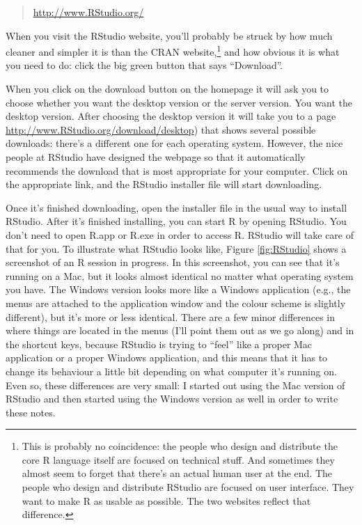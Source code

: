 \documentclass[
]{book}
\begin{document}
\begin{quote}
\url{http://www.RStudio.org/}
\end{quote}

When you visit the RStudio website, you'll probably be struck by how much cleaner and simpler it is than the CRAN website,\footnote{This is probably no coincidence: the people who design and distribute the core R language itself are focused on technical stuff. And sometimes they almost seem to forget that there's an actual human user at the end. The people who design and distribute RStudio are focused on user interface. They want to make R as usable as possible. The two websites reflect that difference.} and how obvious it is what you need to do: click the big green button that says ``Download''.

When you click on the download button on the homepage it will ask you to choose whether you want the desktop version or the server version. You want the desktop version. After choosing the desktop version it will take you to a page \url{http://www.RStudio.org/download/desktop}) that shows several possible downloads: there's a different one for each operating system. However, the nice people at RStudio have designed the webpage so that it automatically recommends the download that is most appropriate for your computer. Click on the appropriate link, and the RStudio installer file will start downloading.

Once it's finished downloading, open the installer file in the usual way to install RStudio. After it's finished installing, you can start R by opening RStudio. You don't need to open R.app or R.exe in order to access R. RStudio will take care of that for you. To illustrate what RStudio looks like, Figure \ref{fig:RStudio} shows a screenshot of an R session in progress. In this screenshot, you can see that it's running on a Mac, but it looks almost identical no matter what operating system you have. The Windows version looks more like a Windows application (e.g., the menus are attached to the application window and the colour scheme is slightly different), but it's more or less identical. There are a few minor differences in where things are located in the menus (I'll point them out as we go along) and in the shortcut keys, because RStudio is trying to ``feel'' like a proper Mac application or a proper Windows application, and this means that it has to change its behaviour a little bit depending on what computer it's running on. Even so, these differences are very small: I started out using the Mac version of RStudio and then started using the Windows version as well in order to write these notes.
\end{document}
